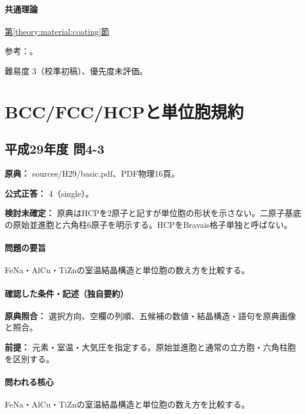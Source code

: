 \paragraph{共通理論} \hyperref[theory:material:coating]{第\ref*{theory:material:coating}節}

\par 参考：\cite{jogmec_nickel2014}。

\par 難易度 3（校準初稿）、優先度未評価。

\section{BCC/FCC/HCPと単位胞規約}

\subsection{平成29年度 問4-3}
\label{q:h29-reg-basic-4-3}

\noindent\textbf{原典：} sources/H29/basic.pdf、PDF物理16頁。

\textbf{公式正答：} 4（single）。

\par\textbf{検討未確定：} 原典はHCPを2原子と記すが単位胞の形状を示さない。二原子基底の原始並進胞と六角柱6原子を明示する。HCPをBravais格子単独と呼ばない。

\paragraph{問題の要旨} FeNa・AlCu・TiZnの室温結晶構造と単位胞の数え方を比較する。

\paragraph{確認した条件・記述（独自要約）}\mbox{}\par

\noindent\textbf{原典照合：} 選択方向、空欄の列順、五候補の数値・結晶構造・語句を原典画像と照合。\par

\noindent\textbf{前提：} 元素・室温・大気圧を指定する。原始並進胞と通常の立方胞・六角柱胞を区別する。\par

\paragraph{問われる核心} FeNa・AlCu・TiZnの室温結晶構造と単位胞の数え方を比較する。

